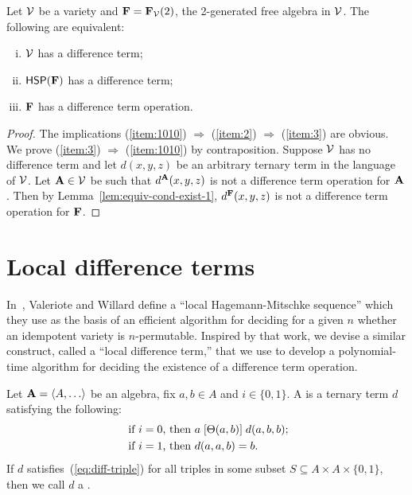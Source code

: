 \begin{thm}
  \label{thm:F}
Let $\mathcal{V}$ be a variety and $\mathbf{F} = \mathbf{F}_{\mathcal{V}}(2)$, the 2-generated
free algebra in $\mathcal{V}$. The following are equivalent:
\begin{enumerate}[(i)]
\item \label{item:1010}
  $\mathcal{V}$ has a difference term;
\item \label{item:2}
  $\mathsf{H} \mathsf{S} \mathsf{P} (\mathbf{F})$ has a difference term;
\item \label{item:3}
  $\mathbf{F}$ has a difference term operation.
\end{enumerate}
\end{thm}
\begin{proof}
  The implications
  (\ref{item:1010}) $\Rightarrow$  (\ref{item:2}) $\Rightarrow$  (\ref{item:3}) are
  obvious. We prove
  (\ref{item:3}) $\Rightarrow$  (\ref{item:1010}) by contraposition.
  Suppose $\mathcal{V}$ has no difference term and let
  $d(x,y,z)$ be an arbitrary ternary term in the language of $\mathcal{V}$.
  Let $\mathbf{A}\in \mathcal{V}$ be such that $d^{\mathbf{A}}(x,y,z)$ is not a difference term
  operation for $\mathbf{A}$. Then by Lemma~\ref{lem:equiv-cond-exist-1}, $d^{\mathbf{F}}(x,y,z)$ 
  is not a difference term operation for $\mathbf{F}$.
\end{proof}

\section{Local difference terms}
\label{sec:local-diff-terms}
In~\cite{MR3239624},
Valeriote and Willard define %
a ``local Hagemann-Mitschke sequence'' which they use as the basis of
an efficient algorithm for deciding for a given $n$ whether an idempotent
variety is $n$-permutable. 
Inspired by that work, we devise a similar construct, called
a ``local difference term,'' that we use to develop a polynomial-time
algorithm for deciding the existence of a difference term operation.

Let $\bA=\< A, \dots\>$ be an algebra, fix $a, b \in A$ and
$i \in \{0,1\}$.
A  is a ternary term $d$ satisfying the following:
\begin{align}
\text{ if $i=0$, then } & a \Comr{\Cg(a,b)} d(a,b,b); \label{eq:diff-triple}\\
\text{ if $i=1$, then } &d(a,a,b) = b. \nonumber
\end{align}
If $d$ satisfies~(\ref{eq:diff-triple}) for all triples
in some subset $S\subseteq A \times A \times \{0,1\}$, then we call $d$
a .

